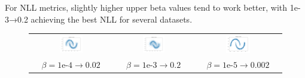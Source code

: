 \documentclass[11pt]{article}
\begin{document}
For NLL metrics, slightly higher upper beta values tend to work better, with 1e-3→0.2 achieving the best NLL for several datasets.


\begin{figure}[H]
    \centering
    \begin{tabular}{ccc}
        \includegraphics[width=0.3\textwidth]{exps/ddpm_2_200_0.0001_0.02_moons/samples_200.png} &
        \includegraphics[width=0.3\textwidth]{exps/ddpm_2_200_0.001_0.2_moons/samples_200.png} &
        \includegraphics[width=0.3\textwidth]{exps/ddpm_2_200_1e-05_0.002_moons/samples_200.png} \\
        $\beta=1\text{e-}4\to0.02$ & $\beta=1\text{e-}3\to0.2$ & $\beta=1\text{e-}5\to0.002$ \\[0.5em]
        

\end{tabular}
\end{figure}
\end{document}
